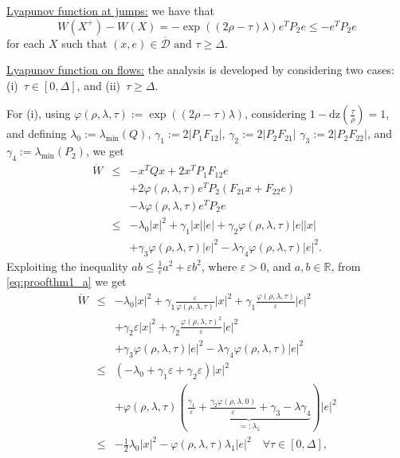 \documentclass[twocolumn]{autart}
\newcommand\real{\ensuremath{{\mathbb R}}}
\newcommand\dz{\mathrm{dz}}
\begin{document}
{ \underline{Lyapunov function at jumps:}} we have that
\begin{equation}
\label{eq:proofthm1_0}
W(X^+) -W(X)= 
-\exp((2\rho-\tau)\lambda)e^TP_2e \leq -e^TP_2e
\end{equation}
for each $X$ such that $(x,e)\in\overline{\mathcal{D}} \mbox{ and } \tau \geq \Delta$. 

{ \underline{Lyapunov function on flows:}}
the analysis is developed by considering two cases:
(i)~$\tau\in[0,\Delta]$, and (ii)~$\tau \geq \Delta$.

For (i), using $\varphi(\rho,\lambda,\tau) := \exp((2\rho-\tau)\lambda)$, 
considering $1-\dz(\frac{\tau}{\rho})=1$, and defining
$\lambda_0 := \lambda_{\min}(Q)$, 
$\gamma_1 := 2|P_1F_{12}|$,
$\gamma_2 := 2|P_2F_{21}|$
$\gamma_3 := 2|P_2F_{22}|$, and
$\gamma_4 := \lambda_{\min}(P_2)$, 
we get
\begin{equation}
\label{eq:proofthm1_a}
\begin{array}{lll}
\dot{W} &\leq & -x^TQx + 2x^TP_1F_{12}e \\
& & + 2\varphi(\rho,\lambda,\tau)e^TP_2(F_{21}x + F_{22}e) \\
& &- \lambda\varphi(\rho,\lambda,\tau) e^TP_2e\\
&\leq &
-\lambda_0|x|^2 + \gamma_1|x||e| + \gamma_2\varphi(\rho,\lambda,\tau)|e||x| \\
& & + 
\gamma_3\varphi(\rho,\lambda,\tau)|e|^2   - \lambda \gamma_4\varphi(\rho,\lambda,\tau) |e|^2.
\end{array}
\end{equation}
Exploiting the inequality $ab\leq \frac{1}{\varepsilon}a^2 + \varepsilon b^2$, 
where $\varepsilon>0$, and $a,b\in\real$, 
from \eqref{eq:proofthm1_a} we get
\begin{equation}
\label{eq:proofthm1_b}
\begin{array}{lll}
\dot{W} 
&\leq &
-\lambda_0|x|^2 + \gamma_1\frac{\varepsilon}{\varphi(\rho,\lambda,\tau)}|x|^2 + 
\gamma_1\frac{\varphi(\rho,\lambda,\tau)}{\varepsilon}|e|^2 \\
& & + 
\gamma_2\varepsilon|x|^2 
+ \gamma_2\frac{\varphi(\rho,\lambda,\tau)^2}{\varepsilon}|e|^2 \\
& & + 
\gamma_3\varphi(\rho,\lambda,\tau)|e|^2   - \lambda \gamma_4\varphi(\rho,\lambda,\tau) |e|^2 \\
& \leq & 
(-\lambda_0 + \gamma_1 \varepsilon +
\gamma_2\varepsilon) |x|^2 \\
& & + 
\varphi(\rho,\lambda,\tau)(\underbrace{\frac{\gamma_1}{\varepsilon} +
\frac{\gamma_2\varphi(\rho,\lambda,0)}{\varepsilon} + \gamma_3 - \lambda \gamma_4}_{=:\lambda_1})
 |e|^2 \\
& \leq &{
-\frac{1}{2}\lambda_0|x|^2 -\varphi(\rho,\lambda,\tau)\lambda_1 |e|^2 }
\quad \forall \tau\in[0,\Delta],
\end{array}
\end{equation}
\end{document}
